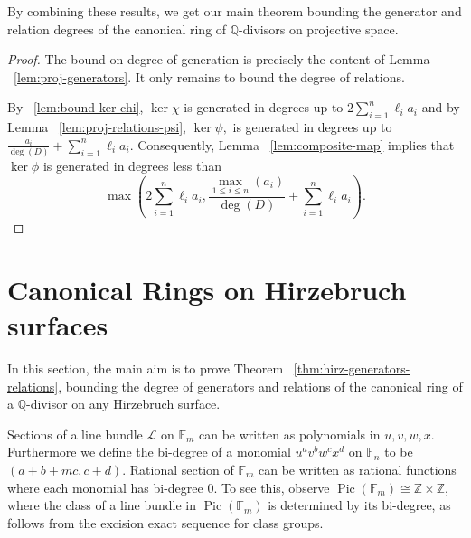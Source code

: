 \documentclass{amsart}
\theoremstyle{plain}
\theoremstyle{definition}
\theoremstyle{remark}
\numberwithin{equation}{section}
\newcommand\bq{{\mathbb Q}}
\newcommand\bz{{\mathbb Z}}
\newcommand\bida{a}
\newcommand\hirz{\mathbb{F}}
\DeclareMathOperator{\Pic}{Pic}
\begin{document}
By combining these results, we get our main theorem bounding
the generator and relation degrees of the canonical ring of
$\bq$-divisors on projective space.

\restateproj*

\begin{proof}
The bound on degree of generation is precisely the content of Lemma 
~\ref{lem:proj-generators}. It only remains to bound the degree of 
relations.

By ~\ref{lem:bound-ker-chi}, $\ker \chi$ is generated in degrees 
up to $2\sum_{i=1}^n \ell_i a_i$ and by Lemma
~\ref{lem:proj-relations-psi}, $\ker \psi,$ is generated in
degrees up to $\frac{\bida_i}{\deg(D)} + \sum_{i=1}^n \ell_i a_i$. 
Consequently, Lemma ~\ref{lem:composite-map} implies that $\ker \phi$
is generated in degrees less than
\[
	\max \left(2 \sum_{i=1}^n \ell_i a_i, \frac{\max_{1\le i \le n}
	(\bida_i)}{\deg(D)} + \sum_{i=1}^n \ell_i a_i \right).
\]
\end{proof}


\section{Canonical Rings on Hirzebruch surfaces}
\label{sec:hirz}
In this section, the main aim is to prove Theorem
~\ref{thm:hirz-generators-relations}, bounding the degree of
generators and relations of the canonical ring of a $\bq$-divisor
on any Hirzebruch surface.

Sections of a line bundle $\mathscr L$ on $\hirz_m$ can be written as
polynomials in $u,v, w,x$.
Furthermore we define the bi-degree of a monomial $u^a v^{b} w^c x^d$
on $\hirz_n$ to be
$(a + b + mc, c + d)$.  Rational section of $\hirz_m$ can be written as
rational functions where each monomial has bi-degree 0. To see this, 
observe
$\Pic(\hirz_m) \cong \bz \times \bz$, where the class of a line bundle
in $\Pic(\hirz_m)$
is determined by its bi-degree, as follows from the excision exact sequence
for class groups.
\end{document}
